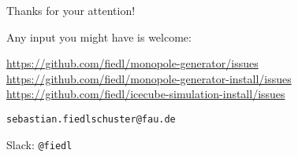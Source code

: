 
\begin{frame}{Thanks for your attention!}
  \begin{center}
    Any input you might have is welcome: \\ \vspace{0.3cm}

    \url{https://github.com/fiedl/monopole-generator/issues} \\ \vspace{0.2cm}
    \url{https://github.com/fiedl/monopole-generator-install/issues} \\ \vspace{0.2cm}
    \url{https://github.com/fiedl/icecube-simulation-install/issues} \\ \vspace{0.5cm}

    \texttt{sebastian.fiedlschuster@fau.de}

    Slack: \texttt{@fiedl}

    \vspace{1.5cm}

  \end{center}
\end{frame}
